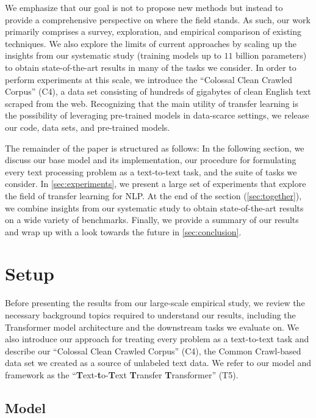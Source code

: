 \documentclass[twoside,11pt]{article}
\makeatletter
\newcommand\footnoteref[1]{\protected@xdef\@thefnmark{\ref{#1}}\@footnotemark}
\makeatother
\begin{document}
We emphasize that our goal is not to propose new methods but instead to provide a comprehensive perspective on where the field stands.
As such, our work primarily comprises a survey, exploration, and empirical comparison of existing techniques.
We also explore the limits of current approaches by scaling up the insights from our systematic study (training models up to $11$ billion parameters) to obtain state-of-the-art results in many of the tasks we consider.
In order to perform experiments at this scale, we introduce the ``Colossal Clean Crawled Corpus'' (C4), a data set consisting of hundreds of gigabytes of clean English text scraped from the web.
Recognizing that the main utility of transfer learning is the possibility of leveraging pre-trained models in data-scarce settings, we release our code, data sets, and pre-trained models.\footnoteref{fn:oss}

The remainder of the paper is structured as follows:
In the following section, we discuss our base model and its implementation, our procedure for formulating every text processing problem as a text-to-text task, and the suite of tasks we consider.
In \cref{sec:experiments}, we present a large set of experiments that explore the field of transfer learning for NLP.
At the end of the section (\cref{sec:together}), we combine insights from our systematic study to obtain state-of-the-art results on a wide variety of benchmarks.
Finally, we provide a summary of our results and wrap up with a look towards the future in \cref{sec:conclusion}.

\section{Setup}
\label{sec:setup}

Before presenting the results from our large-scale empirical study, we review the necessary background topics required to understand our results, including the Transformer model architecture and the downstream tasks we evaluate on.
We also introduce our approach for treating every problem as a text-to-text task and describe our ``Colossal Clean Crawled Corpus'' (C4), the Common Crawl-based data set we created as a source of unlabeled text data.
We refer to our model and framework as the ``\textbf{T}ext-\textbf{t}o-\textbf{T}ext \textbf{T}ransfer \textbf{T}ransformer'' (T5).

\subsection{Model}
\label{sec:model}
\end{document}
